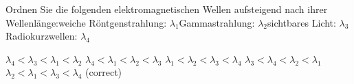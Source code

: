 \documentclass[11pt]{exam}
\begin{document}
\begin{questions}
\vspace{3mm}\question Ordnen Sie die folgenden elektromagnetischen Wellen aufsteigend nach ihrer Wellenlänge:weiche Röntgenstrahlung: \( \lambda_1 \)Gammastrahlung: \( \lambda_2 \)sichtbares Licht: \( \lambda_3 \)Radiokurzwellen: \( \lambda_4 \)

\begin{choices}
	\choice \( \lambda_4 < \lambda_3 < \lambda_1 < \lambda_2 \)
	\choice \( \lambda_4 < \lambda_1 < \lambda_2 < \lambda_3 \)
	\choice \( \lambda_1 < \lambda_2 < \lambda_3 < \lambda_4 \)
	\choice \( \lambda_3 < \lambda_4 < \lambda_2 < \lambda_1 \)
	\choice \( \lambda_2 < \lambda_1 < \lambda_3 < \lambda_4 \) (correct)
\end{choices}

\vspace{3mm}\end{questions}
\end{document}
